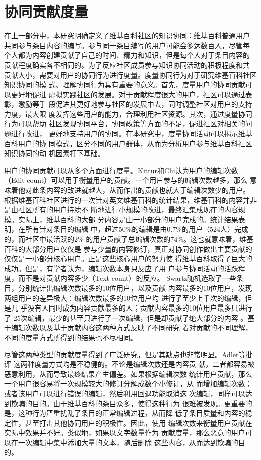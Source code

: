 \section{协同贡献度量}
在上一部分中，本研究明确定义了维基百科社区的知识协同：维基百科普通用户
共同参与条目内容的编写。参与同一条目编写的用户可能会多达数百人，尽管每
个人都为内容创建贡献了自己的时间、精力和知识，但是每个人对于条目内容的
贡献程度确实各不相同的。为了反应社区成员参与知识协同活动的积极程度和共
贡献大小，需要对用户的协同行为进行度量。度量协同行为对于研究维基百科社区知识协同的模
式、理解协同行为具有重要的意义。首先，度量用户的协同贡献可以更好地促进
虚拟实践社区的发展。对于贡献程度很大的用户，社区可以通过表彰，激励等手
段促进其更好地参与社区的发展中去，同时调整社区对用户的支持力度，最大限
度发挥这些用户的能力，合理利用社区资源。其次，通过度量协同行为可以帮助
社区发现协同平台，协同政策等方面的不足，促进社区对相关的问题进行改进，
更好地支持用户的协同。在本研究中，度量协同活动可以揭示维基百科用户的协
同模式，区分不同的用户群体，从而为分析用户参与维基百科社区知识协同的动
机因素打下基础。

用户的协同贡献可以从多个方面进行度量。Kittur和Chi认为用户的编辑次数
（Edit count）可以用于衡量用户的贡献。一个用户参与的编辑次数越多，那么
意味着他对此条内容的改进就越大，从而作出的贡献也就大于编辑次数少的用户。
根据维基百科社区进行的一次针对英文维基百科的统计结果，维基百科的内容并非是由社区所有的用户持续不
断地进行小规模的改进，最终汇集成现在的内容规模。实际上，维基百科的大部
分内容是由一小部分的用户完成的。统计结果表明，在所有针对条目的编辑
中，超过50\%的编辑是由0.7\%的用户（524人）完成的，而社区中最活跃的2\%
的用户贡献了总编辑次数的74\%。这也就意味着，维基百科的大部分用户仅仅是
参与少量的内容修订，真正对协同创作做出主要贡献的仅仅是一小部分核心用户。正是这些核心用户的努力使
 得维基百科取得了巨大的成功。但是，有学者认为，编辑次数本身只反应了用
 户参与协同活动的活跃程度，而不是对贡献内容多少（Text count）的反应。
 Swartz随机选取了一些条目，分别统计出编辑次数最多的10位用户，以及贡献
 内容最多的10位用户，发现两组用户的差异极大：编辑次数最多的10位用户均
 进行了至少上千次的编辑，但是几
 乎没有人同时成为内容贡献最多的人；贡献内容最多的10位用户最多只进行了
 25次编辑，最少的甚至只进行了一次编辑，但是却贡献了绝大部分的内容
 \cite{aswartz}。基于编辑次数以及基于贡献内容这两种方式反映了不同研究
 着对贡献的不同理解，不同的度量方式所得到的结果也不尽相同。

尽管这两种类型的贡献度量得到了广泛研究，但是其缺点也非常明显。Adler等批评
 这两种度量方式均是不稳健的\cite{Adler2008}。不论是编辑次数还是内容贡
 献，二者都容易被恶意利用，从而导致最终结果产生偏差。如果根据编辑次数
 统计用户贡献，那么一个用户很容易将一次规模较大的修订分解成数个小修订，从
 而增加编辑次数；或者该用户可以进行错误的编辑，然后利用回退功能取消这
 次编辑，同样可以达到欺骗的目的。由于维基百科的条目众多，使得这种行为
 很难被发现。更重要的是，这种行为严重扰乱了条目的正常编辑过程，从而降
 低了条目质量和内容的稳定性，甚至打击其他协同用户的积极性。因此，使用
 编辑次数来衡量用户贡献在实际中效果并不好。类似地，如果以文字数量作为
 贡献度量，那么恶意的用户可以在一次编辑中集中添加大量的文本，随后删除
 这些内容，从而达到欺骗的目的。


